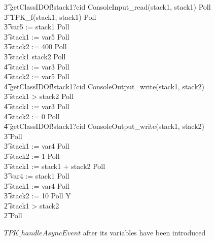 \begin{figure}[tp!]
\begin{circusaction}
    \t3 getClassIDOf!stack1?cid \then ConsoleInput\_read(stack1, stack1) \circseq Poll \circseq \\
    \t3 TPK\_f(stack1, stack1) \circseq Poll \circseq \\
    \t3 var5 := stack1 \circseq Poll \circseq \\
    \t3 stack1 := var5 \circseq Poll \circseq \\
    \t3 stack2 := 400 \circseq Poll \circseq \\
    \t3 \circif stack1 \leq stack2 \circthen Poll \circseq \\
    \t4 stack1 := var3 \circseq Poll \circseq \\
    \t4 stack2 := var5 \circseq Poll \circseq \\
    \t4 getClassIDOf!stack1?cid \then ConsoleOutput\_write(stack1, stack2) \\
    \t3 {} \circelse stack1 > stack2 \circthen Poll \circseq \\
    \t4 stack1 := var3 \circseq Poll \circseq \\
    \t4 stack2 := 0 \circseq Poll \circseq \\
    \t4 getClassIDOf!stack1?cid \then ConsoleOutput\_write(stack1, stack2) \\
    \t3 \circfi \circseq Poll \circseq \\
    \t3 stack1 := var4 \circseq Poll \circseq \\
    \t3 stack2 := 1 \circseq Poll \circseq \\
    \t3 stack1 := stack1 + stack2 \circseq Poll \circseq \\
    \t3 var4 := stack1 \circseq Poll \\
    \t3 stack1 := var4 \circseq Poll \circseq \\
    \t3 stack2 := 10 \circseq Poll \circseq Y \\
    \t2 {} \circelse stack1 > stack2 \circthen \Skip \\
    \t2 \circfi \circseq Poll
  \end{circusaction}
  \caption{$TPK\_handleAsyncEvent$ after its variables have been introduced}
  \label{efs-introduce-variables-example-figure}
\end{figure}

